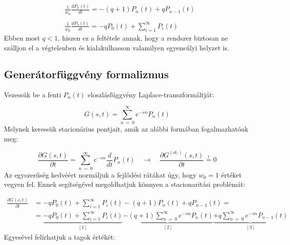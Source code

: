 \begin{align}
    &\frac{1}{w_{0}} \frac{d P_{n} \left( t \right)}{d t}
    =
    - \left( q + 1 \right) P_{n} \left( t \right) + q P_{n-1} \left( t \right)
    \\ \nonumber \\
    &\frac{1}{w_{0}} \frac{d P_{0} \left( t \right)}{d t}
    =
    - q P_{0} \left( t \right)
    +
    \sum_{i=1}^{\infty} P_{i} \left( t \right)
\end{align}
Ebben most $q < 1$, hiszen ez a feltétele annak, hogy a rendszer biztosan ne szálljon el a végtelenben és kialakulhasson valamilyen egyensúlyi helyzet is.

\subsection{Generátorfüggvény formalizmus}
Vezessük be a fenti $P_{n} \left( t \right)$ eloszlásfüggvény Laplace-transzformáltját:

\begin{equation}
    G \left( s, t \right)
    =
    \sum_{n\ =\ 0}^{\infty} e^{-sn} P_{n} \left( t \right)
\end{equation}
Melynek keressük stacionárius pontjait, amik az alábbi formában fogalmazhatóak meg:

\begin{equation}
    \frac{\partial G \left( s, t \right)}{\partial t}
    =
    \sum_{n\ =\ 0}^{\infty} e^{-sn} \frac{d}{dt} P_{n} \left( t \right)
    \quad \to \quad
    \frac{\partial G^{\left( \text{st.} \right)} \left( s, t \right)}{\partial t}
    \overset{!}{=}
    0
\end{equation}
Az egyszerűség kedvéért normáljuk a fejlődési rátákat úgy, hogy $w_{0} = 1$ értéket vegyen fel. Ennek segítségével megoldhatjuk könnyen a stacionaritási problémát:

\begin{align}
    \frac{\partial G \left( s, t \right)}{\partial t}
    &=
    - q P_{0} \left( t \right)
    +
    \sum_{i=1}^{\infty} P_{i} \left( t \right)
    -
    \left( q + 1 \right) P_{n} \left( t \right) + q P_{n-1} \left( t \right)
    = \nonumber \\
    &=
    \underbrace{- q P_{0} \left( t \right)
    +
    \sum_{i=1}^{\infty} P_{i} \left( t \right)}_{[1]}
    \underbrace{
    -
    \left( q + 1 \right)\sum_{n\ =\ 0}^{\infty} e^{-sn} P_{n} \left( t \right)}_{[2]}
    \underbrace{
    +
    q \sum_{n\ =\ 0}^{\infty} e^{-sn} P_{n-1} \left( t \right)}_{[3]}
\end{align}
Egyesével felírhatjuk a tagok értékét:

